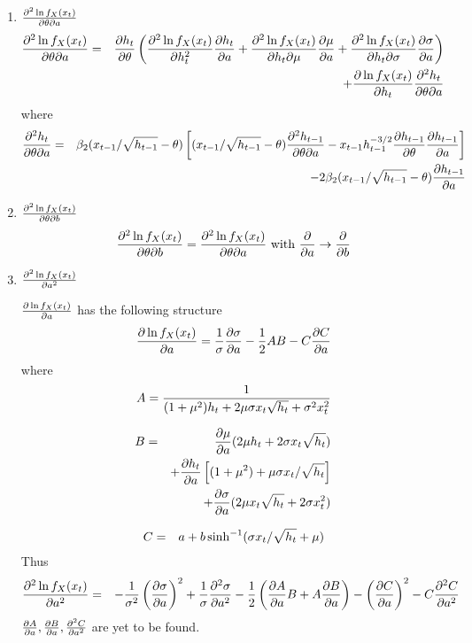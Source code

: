 \documentclass{book}
\begin{document}
\begin{enumerate}
\item $\frac{\partial^2 \ln f_X(x_t)}{\partial \theta \partial a}$
  \begin{eqnarray*}
    \frac{\partial^2 \ln f_X(x_t)}{\partial \theta \partial a} &=&
    \frac{\partial h_t}{\partial \theta} \left(
      \frac{\partial^2 \ln f_X(x_t)}{\partial h_t^2} \frac{\partial h_t}{\partial a}
      + \frac{\partial^2 \ln f_X(x_t)}{\partial h_t \partial \mu} \frac{\partial \mu}{\partial a}
      + \frac{\partial^2 \ln f_X(x_t)}{\partial h_t \partial \sigma} \frac{\partial \sigma}{\partial a}
    \right) \\
    &&
    + \frac{\partial \ln f_X(x_t)}{\partial h_t}\frac{\partial^2 h_t}{\partial \theta \partial a}
  \end{eqnarray*}
  where
  \begin{eqnarray*}
    \frac{\partial^2 h_t}{\partial \theta \partial a} &=&
    \beta_2(x_{t-1}/\sqrt{h_{t-1}} - \theta) \left[
      (x_{t-1}/\sqrt{h_{t-1}} - \theta) \frac{\partial^2 h_{t-1}}{\partial \theta \partial a} -
      x_{t-1} h_{t-1}^{-3/2} \frac{\partial h_{t-1}}{\partial \theta} \frac{\partial h_{t-1}}{\partial a} \right] \\
    && -2 \beta_2 (x_{t-1}/\sqrt{h_{t-1}} - \theta) \frac{\partial h_{t-1}}{\partial a}
  \end{eqnarray*}

\item $\frac{\partial^2 \ln f_X(x_t)}{\partial \theta \partial b}$
  \begin{equation*}
    \frac{\partial^2 \ln f_X(x_t)}{\partial \theta \partial b} = \frac{\partial^2 \ln f_X(x_t)}{\partial \theta \partial a}
    \text{ with } \frac{\partial}{\partial a} \to \frac{\partial}{\partial b}
  \end{equation*}

\item $\frac{\partial^2 \ln f_X(x_t)}{\partial a^2}$

  $\frac{\partial \ln f_X(x_t)}{\partial a}$ has the following structure
  \begin{equation*}
    \frac{\partial \ln f_X(x_t)}{\partial a} = {1 \over \sigma}\frac{\partial \sigma}{\partial a}
    -{1 \over 2} AB - C \frac{\partial C}{\partial a}
  \end{equation*}
  where
  \begin{equation*}
    A = { 1
      \over
      (1 + \mu^2)h_t  +2\mu\sigma x_t \sqrt{h_t} + \sigma^2 x_t^2
    }
  \end{equation*}

  \begin{eqnarray*}
    B &=& \frac{\partial \mu}{\partial a}(2\mu h_t + 2\sigma x_t \sqrt{h_t})\\
    && + \frac{\partial h_t}{\partial a} \left[
      (1 + \mu^2) + \mu\sigma x_t / \sqrt{h_t}
    \right] \\
    && + \frac{\partial \sigma}{\partial a}
    (2\mu x_t \sqrt{h_t} + 2\sigma x_t^2)
  \end{eqnarray*}

  \begin{eqnarray*}
    C &=& a + b\sinh^{-1}(\sigma x_t / \sqrt{h_t} + \mu)
  \end{eqnarray*}
  Thus
  \begin{eqnarray*}
    \frac{\partial^2 \ln f_X(x_t)}{\partial a^2} &=&
    -{1 \over \sigma^2} \left(\frac{\partial \sigma}{\partial a}\right)^2
    + {1 \over \sigma} \frac{\partial^2 \sigma}{\partial a^2}
    -{1 \over 2} \left(\frac{\partial A}{\partial a} B + A \frac{\partial B}{\partial a} \right)
    - \left( \frac{\partial C}{\partial a} \right)^2
    - C \frac{\partial^2 C}{\partial a^2}
  \end{eqnarray*}
  $\frac{\partial A}{\partial a}, \frac{\partial B}{\partial a}, \frac{\partial^2 C}{\partial a^2}$ are yet to be found.


\end{enumerate}
\end{document}
